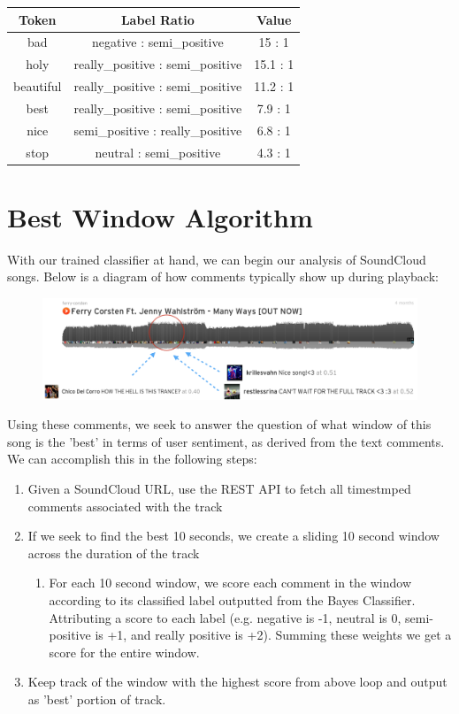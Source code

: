 \documentclass[12pt]{dalcsthesis}
\begin{document}
\begin{center}
  \begin{tabular}{ c | c | c }
    \hline
    \textbf{Token} & \textbf{Label Ratio} & \textbf{Value} \\ \hline
    bad & negative : semi\_positive & 15 : 1 \\ \hline
    holy & really\_positive : semi\_positive & 15.1 : 1 \\ \hline
    beautiful & really\_positive : semi\_positive & 11.2 : 1 \\ \hline
    best & really\_positive : semi\_positive & 7.9 : 1 \\ \hline
    nice & semi\_positive : really\_positive & 6.8 : 1 \\ \hline
    stop & neutral : semi\_positive & 4.3 : 1 \\
    \hline
  \end{tabular}
\end{center}

\section{Best Window Algorithm}

With our trained classifier at hand, we can begin our analysis of SoundCloud songs. Below is a diagram of how comments typically show up during playback:  

\begin{figure}[h]
\includegraphics[scale=.45]{example_comments}
\centering
\end{figure}

Using these comments, we seek to answer the question of what window of this song is the 'best' in terms of user sentiment, as derived from the text comments. We can accomplish this in the following steps:

\begin{enumerate}
  \item Given a SoundCloud URL, use the REST API to fetch all timestmped comments associated with the track
  \item If we seek to find the best 10 seconds, we create a sliding 10 second window across the duration of the track
	\begin{enumerate}
		\item For each 10 second window, we score each comment in the window according to its classified label outputted from the Bayes Classifier. Attributing a score to each label (e.g. negative is -1, neutral is 0, semi-positive is +1, and really positive is +2). Summing these weights we get a score for the entire window.  
	\end{enumerate}
  \item Keep track of the window with the highest score from above loop and output as 'best' portion of track.
\end{enumerate}
\end{document}
